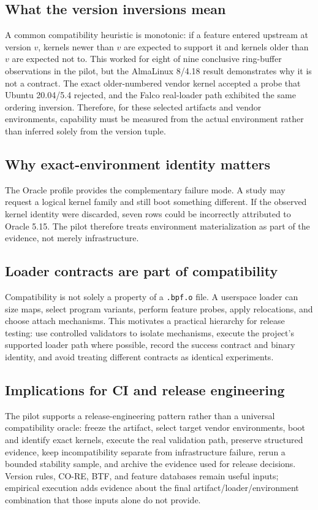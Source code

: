 \documentclass[10pt]{article}
\newcommand{\code}[1]{\texttt{#1}}
\begin{document}
\subsection{What the version inversions mean}
A common compatibility heuristic is monotonic: if a feature entered upstream at version $v$, kernels newer than $v$ are expected to support it and kernels older than $v$ are expected not to. This worked for eight of nine conclusive ring-buffer observations in the pilot, but the AlmaLinux 8/4.18 result demonstrates why it is not a contract. The exact older-numbered vendor kernel accepted a probe that Ubuntu 20.04/5.4 rejected, and the Falco real-loader path exhibited the same ordering inversion. Therefore, for these selected artifacts and vendor environments, capability must be measured from the actual environment rather than inferred solely from the version tuple.

\subsection{Why exact-environment identity matters}
The Oracle profile provides the complementary failure mode. A study may request a logical kernel family and still boot something different. If the observed kernel identity were discarded, seven rows could be incorrectly attributed to Oracle 5.15. The pilot therefore treats environment materialization as part of the evidence, not merely infrastructure.

\subsection{Loader contracts are part of compatibility}
Compatibility is not solely a property of a \code{.bpf.o} file. A userspace loader can size maps, select program variants, perform feature probes, apply relocations, and choose attach mechanisms. This motivates a practical hierarchy for release testing: use controlled validators to isolate mechanisms, execute the project's supported loader path where possible, record the success contract and binary identity, and avoid treating different contracts as identical experiments.

\subsection{Implications for CI and release engineering}
The pilot supports a release-engineering pattern rather than a universal compatibility oracle: freeze the artifact, select target vendor environments, boot and identify exact kernels, execute the real validation path, preserve structured evidence, keep incompatibility separate from infrastructure failure, rerun a bounded stability sample, and archive the evidence used for release decisions. Version rules, CO-RE, BTF, and feature databases remain useful inputs; empirical execution adds evidence about the final artifact/loader/environment combination that those inputs alone do not provide.
\end{document}
